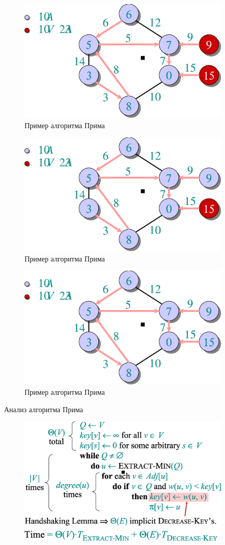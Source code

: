 \documentclass[a4paper,11pt]{article}
\begin{document}
\begin{figure}[ht]
  \centering
  \includegraphics[width=4in]{lecture16/prim11.eps}
  \caption{Пример алгоритма Прима}
\end{figure}
\begin{figure}[ht]
  \centering
  \includegraphics[width=4in]{lecture16/prim12.eps}
  \caption{Пример алгоритма Прима}
\end{figure}
\begin{figure}[ht]
  \centering
  \includegraphics[width=4in]{lecture16/prim13.eps}
  \caption{Пример алгоритма Прима}
\end{figure}

Анализ алгоритма Прима

\begin{figure}[ht]
  \centering
  \includegraphics[width=4in]{lecture16/analysis.eps}
\end{figure}
\end{document}
